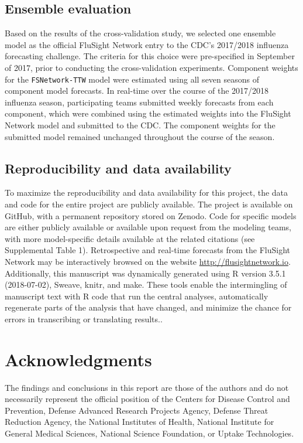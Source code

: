 \documentclass{article}\usepackage[]{graphicx}\usepackage[]{color}
\begin{document}
\subsection{Ensemble evaluation}

Based on the results of the cross-validation study, we selected one ensemble model as the official FluSight Network entry to the CDC's 2017/2018 influenza forecasting challenge.
The criteria for this choice were pre-specified in September of 2017, prior to conducting the cross-validation experiments.\cite{Reich2017github} 
Component weights for the {\tt FSNetwork-TTW} model were estimated using all seven seasons of component model forecasts. In real-time over the course of the 2017/2018 influenza season, participating teams submitted weekly forecasts from each component, which were combined using the estimated weights into the FluSight Network model and submitted to the CDC. The component weights for the submitted model remained unchanged throughout the course of the season.

\subsection{Reproducibility and data availability}

To maximize the reproducibility and data availability for this project, the data and code for the entire project are publicly available.
The project is available on GitHub\cite{fsngithub2018}, with a permanent repository stored on Zenodo\cite{fsnzenodo2018}.
Code for specific models are either publicly available or available upon request from the modeling teams, with more model-specific details available at the related citations (see Supplemental Table 1).
Retrospective and real-time forecasts from the FluSight Network may be interactively browsed on the website \url{http://flusightnetwork.io}.
Additionally, this manuscript was dynamically generated using R version 3.5.1 (2018-07-02), Sweave, knitr, and make.
These tools enable the intermingling of manuscript text with R code that run the central analyses, automatically regenerate parts of the analysis that have changed, and minimize the chance for errors in transcribing or translating results.\cite{Xie2015,RCore2017}.

\section*{Acknowledgments}
The findings and conclusions in this report are those of the authors and do not necessarily represent the official position of the Centers for Disease Control and Prevention, Defense Advanced Research Projects Agency, Defense Threat Reduction Agency, the National Institutes of Health, National Institute for General Medical Sciences, National Science Foundation, or Uptake Technologies.
\end{document}

